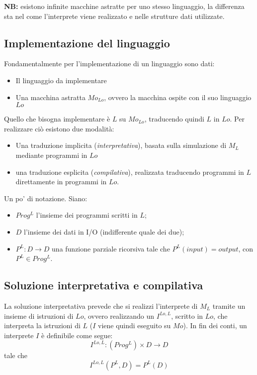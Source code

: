 \documentclass[a4paper, 10pt]{article}
\begin{document}
	\textbf{NB:} esistono infinite macchine astratte per uno stesso linguaggio, la differenza sta nel come l'interprete viene realizzato e nelle strutture dati utilizzate.
	
	\subsection{Implementazione del linguaggio}
	
	Fondamentalmente per l'implementazione di un linguaggio sono dati:
	\begin{itemize}
		\item Il linguaggio da implementare
		\item Una macchina astratta $Mo_{Lo}$, ovvero la macchina ospite con il suo linguaggio $Lo$
	\end{itemize}
	Quello che bisogna implementare è $L$ su $Mo_{Lo}$, traducendo quindi $L$ in $Lo$. Per realizzare ciò esistono due modalità:
	\begin{itemize}
		\item Una traduzione implicita (\textit{interpretativa}), basata sulla simulazione di $M_L$ mediante programmi in $Lo$
		\item una traduzione esplicita (\textit{compilativa}), realizzata traducendo programmi in $L$ direttamente in programmi in $Lo$.
	\end{itemize}
	
	Un po' di notazione. Siano:
	\begin{itemize}
		\item $Prog^L$ l'insieme dei programmi scritti in $L$;
		\item $D$ l'insieme dei dati in I/O (indifferente quale dei due);
		\item $P^L:D\to D$ una funzione parziale ricorsiva tale che $P^L(input)=output$, con $P^L\in Prog^L$.
	\end{itemize}
	
	\subsection{Soluzione interpretativa e compilativa}
	La soluzione interpretativa prevede che si realizzi l'interprete di $M_L$ tramite un insieme di istruzioni di $Lo$, ovvero realizzando un $I^{Lo,L}$, scritto in $Lo$, che interpreta la istruzioni di $L$ ($I$ viene quindi eseguito su $Mo$).
	In fin dei conti, un interprete $I$ è definibile come segue:
	\[
	I^{Lo,L}:(Prog^L) \times D\to D
	\]
	tale che 
	\[
	I^{Lo,L}(P^L, D)=P^L(D)
	\]
	
\end{document}
